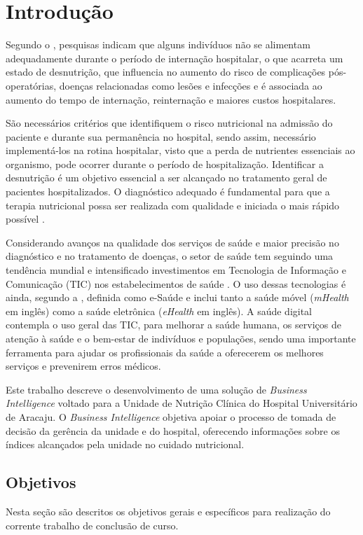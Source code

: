 \chapter{Introdução}
Segundo o , pesquisas indicam que alguns indivíduos não se alimentam adequadamente durante o período de internação hospitalar, o que acarreta um estado de desnutrição, que influencia no aumento do risco de complicações pós-operatórias, doenças relacionadas como lesões e infecções e é associada ao aumento do tempo de internação, reinternação e maiores custos hospitalares.

São necessários critérios que identifiquem o risco nutricional na admissão do paciente e durante sua permanência no hospital, sendo assim, necessário implementá-los na rotina hospitalar, visto que a perda de nutrientes essenciais ao organismo, pode ocorrer durante o período de hospitalização. Identificar a desnutrição é um objetivo essencial a ser alcançado no tratamento geral de pacientes hospitalizados. O diagnóstico adequado é fundamental para que a terapia nutricional possa ser realizada com qualidade e iniciada o mais rápido possível \cite{keller2014}.

Considerando avanços na qualidade dos serviços de saúde e maior precisão no diagnóstico e no tratamento de doenças, o setor de saúde tem seguindo uma tendência mundial e intensificado investimentos em Tecnologia de Informação e Comunicação (TIC) nos estabelecimentos de saúde \cite{saudedigital2019}. O uso dessas tecnologias é ainda, segundo a , definida como e-Saúde e inclui tanto a saúde móvel (\textit{mHealth} em inglês) como a saúde eletrônica (\textit{eHealth} em inglês). A saúde digital contempla o uso geral das TIC, para melhorar a saúde humana, os serviços de atenção à saúde e o bem-estar de indivíduos e populações, sendo uma importante ferramenta para ajudar os profissionais da saúde a oferecerem os melhores serviços e prevenirem erros médicos.

Este trabalho descreve o desenvolvimento de uma solução de \textit{Business Intelligence} voltado para a Unidade de Nutrição Clínica do Hospital Universitário de Aracaju. O \textit{Business Intelligence} objetiva apoiar o processo de tomada de decisão da gerência da unidade e do hospital, oferecendo informações sobre os índices alcançados pela unidade no cuidado nutricional.  


\section{Objetivos}\label{sec-divisoes}
Nesta seção são descritos os objetivos gerais e específicos para realização do corrente trabalho de conclusão de curso.

